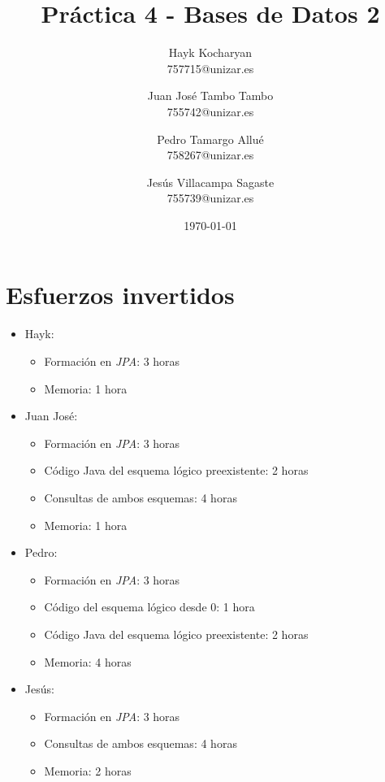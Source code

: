 \documentclass[11pt,a4paper]{article}
\begin{document}
\begin{titlepage}
	\title{{\Huge \textbf{Práctica 4 - Bases de Datos 2}}}
	\author{
	  Hayk Kocharyan\\
	  757715@unizar.es
	  \and
	  Juan José Tambo Tambo\\
	  755742@unizar.es
	  \and
	  Pedro Tamargo Allué\\
	  758267@unizar.es
	  \and
	  Jesús Villacampa Sagaste\\
	  755739@unizar.es
	}
	\date{\today}
	
	\clearpage\maketitle
	\thispagestyle{empty}
	\tableofcontents
	\listoffigures
\end{titlepage}

\section{Esfuerzos invertidos}

\begin{itemize}
\item Hayk:
	\begin{itemize}
	\item Formación en \emph{JPA}: 3 horas
	\item Memoria: 1 hora
	\end{itemize}
\item Juan José:
	\begin{itemize}
	\item Formación en \emph{JPA}: 3 horas
	\item Código Java del esquema lógico preexistente: 2 horas
	\item Consultas de ambos esquemas: 4 horas
	\item Memoria: 1 hora
	\end{itemize}
\item Pedro:
	\begin{itemize}
	\item Formación en \emph{JPA}: 3 horas
	\item Código del esquema lógico desde 0: 1 hora
	\item Código Java del esquema lógico preexistente: 2 horas
	\item Memoria: 4 horas
	\end{itemize}
\item Jesús:
	\begin{itemize}
	\item Formación en \emph{JPA}: 3 horas
	\item Consultas de ambos esquemas: 4 horas
	\item Memoria: 2 horas
	\end{itemize}
\end{itemize}
\end{document}
